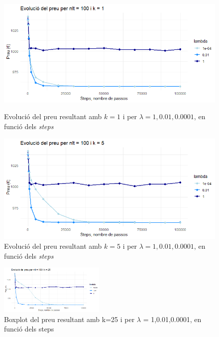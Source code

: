 \documentclass[a4paper]{article}
\begin{document}
	\begin{figure}[H]
		\centering
		\begin{minipage}{0.45\textwidth}
			\centering
			\includegraphics[width=\textwidth]{images/exp3_k1.png}
			\caption{Evolució del preu resultant amb $k=1$ i per $\lambda = {1, 0.01, 0.0001}$, en funció dels \textit{steps}}
			\label{fig:exp3_k1}
		\end{minipage}%
		\hspace{0.05\textwidth} %
		\begin{minipage}{0.45\textwidth}
			\centering
			\includegraphics[width=\textwidth]{images/exp3_k5.png}
			\caption{Evolució del preu resultant amb $k=5$ i per $\lambda = {1,0.01,0.0001}$, en funció dels \textit{steps}}
			\label{fig:exp3_k5}
		\end{minipage}
	\end{figure}
	
	\begin{figure}[H]
		\centering
		\includegraphics[width=0.45\textwidth]{images/exp3_k25.png}
		\caption{Boxplot del preu resultant amb k=25 i per $\lambda$ = {1,0.01,0.0001}, en funció dels steps}
		\label{fig:exp3_k25}
	\end{figure}
	
\end{document}
